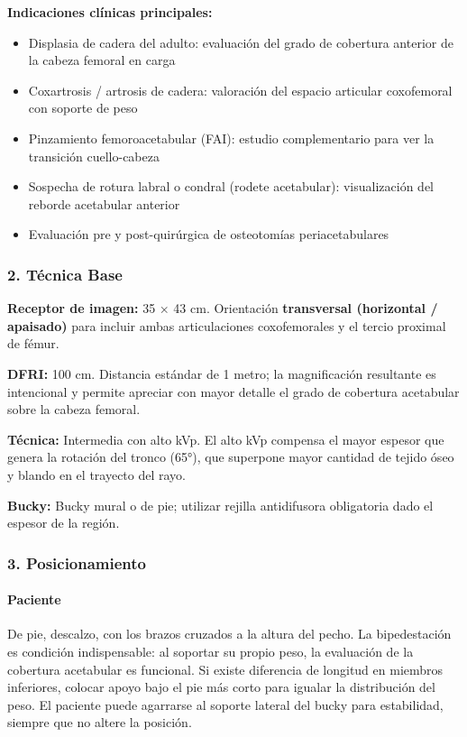 	\textbf{Indicaciones clínicas principales:}
	\begin{itemize}
		\item Displasia de cadera del adulto: evaluación del grado de cobertura anterior de la cabeza femoral en carga
		\item Coxartrosis / artrosis de cadera: valoración del espacio articular coxofemoral con soporte de peso
		\item Pinzamiento femoroacetabular (FAI): estudio complementario para ver la transición cuello-cabeza
		\item Sospecha de rotura labral o condral (rodete acetabular): visualización del reborde acetabular anterior
		\item Evaluación pre y post-quirúrgica de osteotomías periacetabulares
	\end{itemize}
	
	\subsubsection*{2. Técnica Base}
	
	\textbf{Receptor de imagen:} 35 × 43 cm. Orientación \textbf{transversal (horizontal / apaisado)} para incluir ambas articulaciones coxofemorales y el tercio proximal de fémur.
	
	\textbf{DFRI:} 100 cm. Distancia estándar de 1 metro; la magnificación resultante es intencional y permite apreciar con mayor detalle el grado de cobertura acetabular sobre la cabeza femoral.
	
	\textbf{Técnica:} Intermedia con alto kVp. El alto kVp compensa el mayor espesor que genera la rotación del tronco (65°), que superpone mayor cantidad de tejido óseo y blando en el trayecto del rayo.
	
	\textbf{Bucky:} Bucky mural o de pie; utilizar rejilla antidifusora obligatoria dado el espesor de la región.
	
	\subsubsection*{3. Posicionamiento}
	
	\paragraph{Paciente}
	De pie, descalzo, con los brazos cruzados a la altura del pecho. La bipedestación es condición indispensable: al soportar su propio peso, la evaluación de la cobertura acetabular es funcional. Si existe diferencia de longitud en miembros inferiores, colocar apoyo bajo el pie más corto para igualar la distribución del peso. El paciente puede agarrarse al soporte lateral del bucky para estabilidad, siempre que no altere la posición.
	
